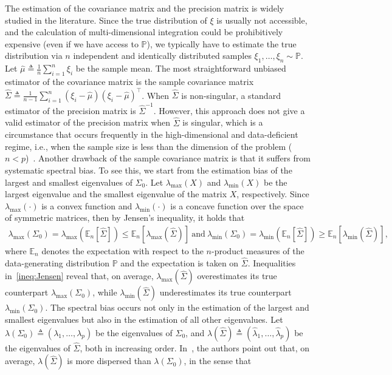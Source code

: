 \documentclass[11pt]{article}
\def\P{\mathbb{P}}
\newcommand{\Let}{\triangleq}
\def\transpose{\top}
\def\P{\mathbb{P}}
\def\E {\mathbb{E}}
\newcommand{\wh}{\widehat}
\begin{document}
The estimation of the covariance matrix and the precision matrix is widely studied in the literature. Since the true distribution of $\xi$ 
is usually not accessible, and the calculation of multi-dimensional integration could be prohibitively expensive (even if we have access to $\P$), we typically have to estimate the true distribution via $n$ independent and identically distributed samples $\xi_1,\ldots,\xi_n\sim \P$. Let $\widehat{\mu}\Let \frac{1}{n}\sum_{i=1}^n \xi_i$ be the sample mean. The most straightforward unbiased estimator of the covariance matrix is the sample covariance matrix $\widehat{\Sigma}\Let \frac{1}{n-1}\sum_{i=1}^n (\xi_i-\widehat{\mu})(\xi_i-\widehat{\mu})^\transpose$. When $\wh{\Sigma}$ is non-singular, a standard estimator of the precision matrix is $\wh{\Sigma}^{-1}$. However, this approach does not give a valid estimator of the precision matrix when $\wh\Sigma$ is singular, which is a circumstance that occurs frequently in the high-dimensional and data-deficient regime, i.e., when the sample size is less than the dimension of the problem ($n<p$)~\citep{ref:wainwright2019high}. 
Another drawback of the sample covariance matrix is that it suffers from systematic spectral bias. To see this, we start from the estimation bias of the largest and smallest eigenvalues of $\Sigma_0$. Let $\lambda_{\max}(X)$ and $\lambda_{\min}(X)$ be the largest eigenvalue and the smallest eigenvalue of the matrix $X$, respectively.
Since $\lambda_{\max}(\cdot)$ is a convex function and $\lambda_{\min}(\cdot)$ is a concave function over the space of symmetric matrices, then by Jensen's inequality, it holds that
\begin{align}
    \lambda_{\max}(\Sigma_0)=\lambda_{\max}(\E_n[\wh\Sigma]) \leq \E_n[\lambda_{\max}(\wh\Sigma)]~\text{and}~\lambda_{\min}(\Sigma_0)=\lambda_{\min}(\E_n[\wh\Sigma]) \geq \E_n[\lambda_{\min}(\wh\Sigma)],\label{ineq:Jensen}
\end{align}
where $\E_n$ denotes the expectation with respect to the $n$-product measures of the data-generating distribution $\P$ and the expectation is taken on $\wh\Sigma$. Inequalities in~\eqref{ineq:Jensen} reveal that, on average, $\lambda_{\max}(\wh\Sigma)$ overestimates its true counterpart $\lambda_{\max}(\Sigma_0)$, while $\lambda_{\min}(\wh\Sigma)$ underestimates its true counterpart $\lambda_{\min}(\Sigma_0)$. 
The spectral bias occurs not only in the estimation of the largest and smallest eigenvalues but also in the estimation of all other eigenvalues.
Let $\lambda(\Sigma_0)\Let (\lambda_1,\ldots,\lambda_p)$ be the eigenvalues of $\Sigma_0$, and $\lambda(\wh\Sigma)\Let (\wh\lambda_1,\ldots,\wh\lambda_p)$ be the eigenvalues of $\wh\Sigma$, both in increasing order. In~\cite{ref:LEDOIT2004365}, the authors point out that, on average, $\lambda(\wh\Sigma)$ is more dispersed than $\lambda(\Sigma_0)$, in the sense that
\end{document}
